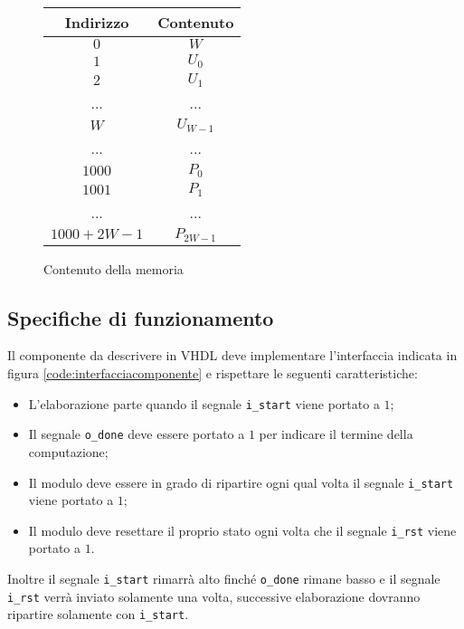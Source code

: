 \begin{figure}[!ht]
    \centering
    \begin{tabular}{c | c}
        Indirizzo   & Contenuto  \\
        \hline
        $0$         & $W$        \\
        $1$         & $U_0$      \\
        $2$         & $U_1$      \\
        ...         & ...        \\
        $W$         & $U_{W-1}$  \\
        ...         & ...        \\
        $1000$      & $P_{0}$    \\
        $1001$      & $P_{1}$    \\
        ...         & ...        \\
        $1000+2W-1$ & $P_{2W-1}$ \\
    \end{tabular}
    \caption{Contenuto della memoria}
    \label{table:memoria}
\end{figure}

\subsection{Specifiche di funzionamento}

Il componente da descrivere in VHDL deve implementare l'interfaccia indicata in figura \ref{code:interfacciacomponente} e rispettare le seguenti caratteristiche:

\begin{itemize}
    \item L'elaborazione parte quando il segnale \verb|i_start| viene portato a $1$;
    \item Il segnale \verb|o_done| deve essere portato a $1$ per indicare il termine della computazione;
    \item Il modulo deve essere in grado di ripartire ogni qual volta il segnale \verb|i_start| viene portato a $1$;
    \item Il modulo deve resettare il proprio stato ogni volta che il segnale \verb|i_rst| viene portato a $1$.
\end{itemize}

Inoltre il segnale \verb|i_start| rimarrà alto finché \verb|o_done| rimane basso e il segnale \verb|i_rst| verrà inviato solamente una volta, successive elaborazione dovranno ripartire solamente con \verb|i_start|.

